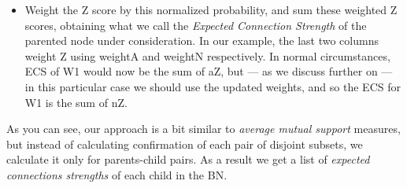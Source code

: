 \documentclass[10pt,]{scrartcl}
\newcommand{\s}[1]{\mbox{\textsf{#1}}}
\begin{document}
\begin{itemize}
\item Weight the Z score by this normalized probability, and sum these weighted Z scores, obtaining what we call the \emph{Expected Connection Strength} of the parented node under consideration.   In our example, the last two columns weight \textsf{Z} using \textsf{weightA} and \textsf{weightN} respectively.  
   In normal circumstances, \textsf{ECS} of \textsf{W1} would now be the sum of \textsf{aZ}, but --- as we discuss further on --- in this particular case we should use the updated weights, and so the \textsf{ECS} for \textsf{W1} is the sum of \textsf{nZ}.





\end{itemize}

As you can see, our approach is a bit similar to
\textit{average mutual support} measures, but instead of calculating
confirmation of each pair of disjoint subsets, we calculate it only for
parents-child pairs. As a result we get a list of
\textit{expected connections strengths} of each child in the BN.

\begin{table}
\begin{table}[H]
\centering
{}
\end{table}
\caption{ECS calculation table for \s{W1} in the first scenario in the \s{Witness} problem.}
\label{t:w1}
\end{table}
\end{document}
